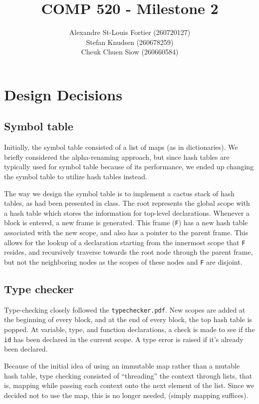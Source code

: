 \documentclass{article}
\begin{document}
\title{COMP 520 - Milestone 2}
\author{
Alexandre St-Louis Fortier (260720127)\\
Stefan Knudsen (260678259)\\
Cheuk Chuen Siow (260660584)}
\maketitle

\raggedright
\section*{Design Decisions}
\subsection*{Symbol table}
Initially, the symbol table consisted of a list of maps (as in dictionaries). We briefly considered the alpha-renaming approach, but since hash tables are typically used for symbol table because of its performance, we ended up changing the symbol table to utilize hash tables instead.

The way we design the symbol table is to implement a cactus stack of hash tables, as had been presented in class. The root represents the global scope with a hash table which stores the information for top-level declarations. Whenever a block is entered, a new frame is generated. This frame (\verb|F|) has a new hash table associated with the new scope, and also has a pointer to the parent frame. This allows for the lookup of a declaration starting from the innermost scope that \verb|F| resides, and recursively traverse towards the root node through the parent frame, but not the neighboring nodes as the scopes of these nodes and \verb|F| are disjoint.

\subsection*{Type checker}
Type-checking closely followed the \verb|typechecker.pdf|. New scopes are added at the beginning of every block, and at the end of every block, the top hash table is popped. At variable, type, and function declarations, a check is made to see if the \verb|id| has been declared in the current scope. A type error is raised if it's already been declared.

Because of the initial idea of using an immutable map rather than a mutable hash table, type checking consisted of ``threading'' the context through lists, that is, mapping while passing each context onto the next element of the list. Since we decided not to use the map, this is no longer needed, (simply mapping suffices).
\end{document}
